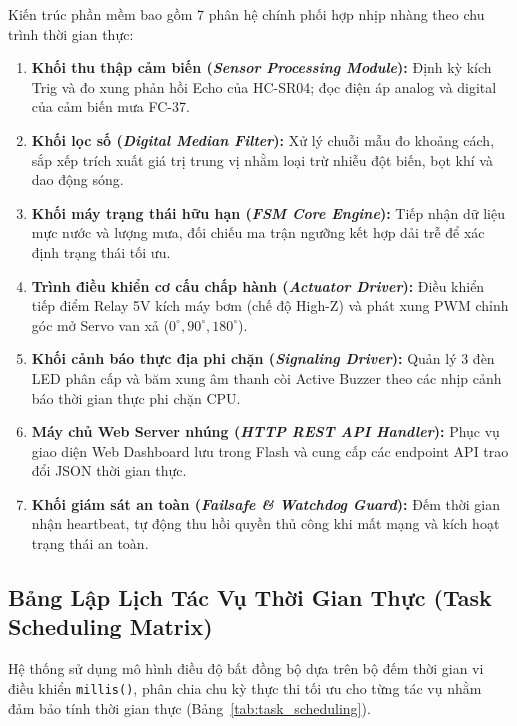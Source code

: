Kiến trúc phần mềm bao gồm 7 phân hệ chính phối hợp nhịp nhàng theo chu trình thời gian thực:
\begin{enumerate}
    \setlength{\itemsep}{1pt}
    \setlength{\parskip}{0pt}
    \item \textbf{Khối thu thập cảm biến (\textit{Sensor Processing Module}):} Định kỳ kích Trig và đo xung phản hồi Echo của HC-SR04; đọc điện áp analog và digital của cảm biến mưa FC-37.
    \item \textbf{Khối lọc số (\textit{Digital Median Filter}):} Xử lý chuỗi mẫu đo khoảng cách, sắp xếp trích xuất giá trị trung vị nhằm loại trừ nhiễu đột biến, bọt khí và dao động sóng.
    \item \textbf{Khối máy trạng thái hữu hạn (\textit{FSM Core Engine}):} Tiếp nhận dữ liệu mực nước và lượng mưa, đối chiếu ma trận ngưỡng kết hợp dải trễ để xác định trạng thái tối ưu.
    \item \textbf{Trình điều khiển cơ cấu chấp hành (\textit{Actuator Driver}):} Điều khiển tiếp điểm Relay 5V kích máy bơm (chế độ High-Z) và phát xung PWM chỉnh góc mở Servo van xả ($0^\circ, 90^\circ, 180^\circ$).
    \item \textbf{Khối cảnh báo thực địa phi chặn (\textit{Signaling Driver}):} Quản lý 3 đèn LED phân cấp và băm xung âm thanh còi Active Buzzer theo các nhịp cảnh báo thời gian thực phi chặn CPU.
    \item \textbf{Máy chủ Web Server nhúng (\textit{HTTP REST API Handler}):} Phục vụ giao diện Web Dashboard lưu trong Flash và cung cấp các endpoint API trao đổi JSON thời gian thực.
    \item \textbf{Khối giám sát an toàn (\textit{Failsafe \& Watchdog Guard}):} Đếm thời gian nhận heartbeat, tự động thu hồi quyền thủ công khi mất mạng và kích hoạt trạng thái an toàn.
\end{enumerate}

\subsection{Bảng Lập Lịch Tác Vụ Thời Gian Thực (Task Scheduling Matrix)}
Hệ thống sử dụng mô hình điều độ bất đồng bộ dựa trên bộ đếm thời gian vi điều khiển \texttt{millis()}, phân chia chu kỳ thực thi tối ưu cho từng tác vụ nhằm đảm bảo tính thời gian thực (Bảng~\ref{tab:task_scheduling}).

